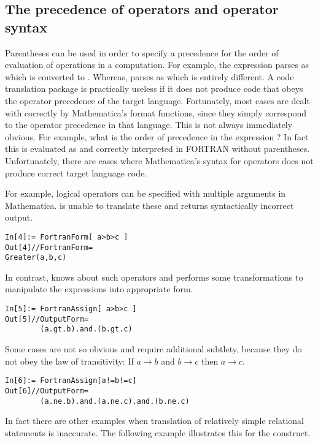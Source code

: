 \documentclass [12pt,twoside]{article}
\begin{document}
\subsection{The precedence of operators and operator syntax}

Parentheses can be used in order to specify a precedence for the order of
evaluation of operations in a computation. For example, the expression
 parses as  which is converted to
. Whereas,  parses as  which
is entirely different. A code translation package is practically useless if it
does not produce code that obeys the operator precedence of the target language.
Fortunately, most cases are dealt with correctly by Mathematica's format
functions, since they simply correspond to the operator precedence in that
language. This is not always immediately obvious. For example, what is the order
of precedence in the expression ? In fact this is evaluated as
 and correctly interpreted in FORTRAN without parentheses.
Unfortunately, there are cases where Mathematica's syntax for operators does not
produce correct target language code.

For example, logical operators can be specified with multiple arguments in
Mathematica.  is unable to translate these
and returns syntactically incorrect output.
\begin{verbatim}
In[4]:= FortranForm[ a>b>c ]
Out[4]//FortranForm=
Greater(a,b,c)
\end{verbatim}
In contrast,  knows about such operators and performs some
transformations to manipulate the expressions into appropriate form.
\begin{verbatim}
In[5]:= FortranAssign[ a>b>c ]
Out[5]//OutputForm=
        (a.gt.b).and.(b.gt.c)
\end{verbatim}
Some cases are not so obvious and require additional subtlety, because they do not obey
the law of transitivity: If $a \rightarrow b$ and $b \rightarrow c$ then
$a\rightarrow c$.

\begin{verbatim}
In[6]:= FortranAssign[a!=b!=c]
Out[6]//OutputForm=
        (a.ne.b).and.(a.ne.c).and.(b.ne.c)
\end{verbatim}
In fact there are other examples when translation of relatively simple relational
statements is inaccurate. The following example illustrates this for the 
construct.
\end{document}
